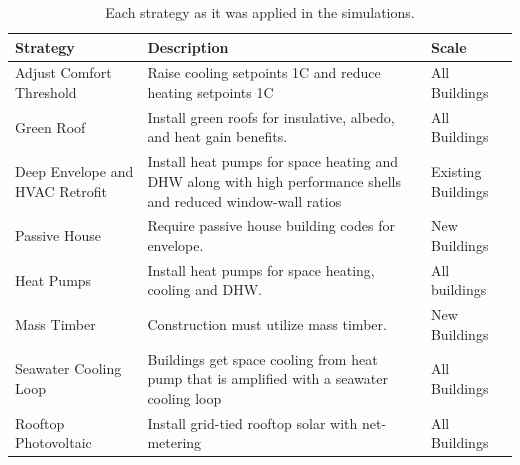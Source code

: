 \documentclass[twocolumn, a4paper,10pt]{article}
\begin{document}
\begin{table}[ht]
    \vspace{-5pt}   %
    \caption{Each strategy as it was applied in the simulations.}
    \footnotesize
    \label{tab:strategies}
    \centering
    \begin{tabularx}{\linewidth}{|>{\hsize=0.2\hsize}X|
                              >{\hsize=0.5\hsize}X|
                              >{\hsize=0.3\hsize}X|}
        \hline
        \bf{Strategy} & \bf{Description} & \bf{Scale} \\
        \hline
        Adjust Comfort Threshold & Raise cooling setpoints 1C and reduce heating setpoints 1C & All Buildings \\
        \hline
        Green Roof & Install green roofs for insulative, albedo, and heat gain benefits. & All Buildings \\
        \hline
        Deep Envelope and HVAC Retrofit & Install heat pumps for space heating and DHW along with high performance shells and reduced window-wall ratios & Existing Buildings \\
        \hline
        Passive House & Require passive house building codes for envelope. & New Buildings \\
        \hline
        Heat Pumps & Install heat pumps for space heating, cooling and DHW. & All buildings \\
        \hline
        Mass Timber & Construction must utilize mass timber. & New Buildings \\
        \hline
        Seawater Cooling Loop & Buildings get space cooling from heat pump that is amplified with a seawater cooling loop & All Buildings \\
        \hline
        Rooftop Photovoltaic & Install grid-tied rooftop solar with net-metering & All Buildings \\
        \hline
    \end{tabularx}
    \vspace{-5pt}   %
\end{table}
\end{document}

